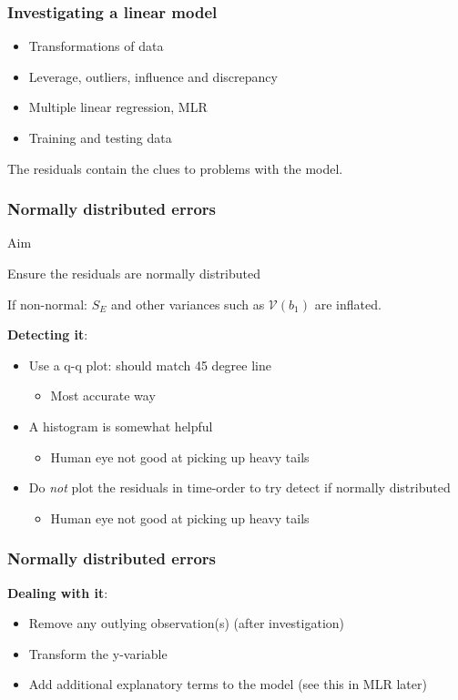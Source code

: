 \begin{frame}\frametitle{Investigating a linear model}
	\begin{itemize}
		\item	Transformations of data
		\item	Leverage, outliers, influence and discrepancy
		\item	Multiple linear regression, MLR
		\item	Training and testing data
	\end{itemize}

	\vspace{12pt}
	The residuals contain the clues to problems with the model.
\end{frame}

\begin{frame}\frametitle{Normally distributed errors}

	\begin{exampleblock}{Aim}
		\begin{center}
			Ensure the residuals are normally distributed
		\end{center}
	\end{exampleblock}

	If non-normal: $S_E$ and other variances such as $\mathcal{V}(b_1)$ are inflated.

	\vspace{12pt}
	\textbf{Detecting it}:
	\begin{itemize}
		\item	Use a q-q plot: should match 45 degree line
		\begin{itemize}
			\item	Most accurate way
		\end{itemize}
		\item	A histogram is somewhat helpful
		\begin{itemize}
			\item	Human eye not good at picking up heavy tails
		\end{itemize}
		\item	Do \emph{not} plot the residuals in time-order to try detect if normally distributed
		\begin{itemize}
			\item	Human eye not good at picking up heavy tails
		\end{itemize}
	\end{itemize}
\end{frame}

\begin{frame}\frametitle{Normally distributed errors}

	\textbf{Dealing with it}:
	\begin{itemize}
		\item	Remove any outlying observation(s) (after investigation)
		\item	Transform the y-variable
		\item	Add additional explanatory terms to the model (see this in MLR later)
	\end{itemize}
\end{frame}


